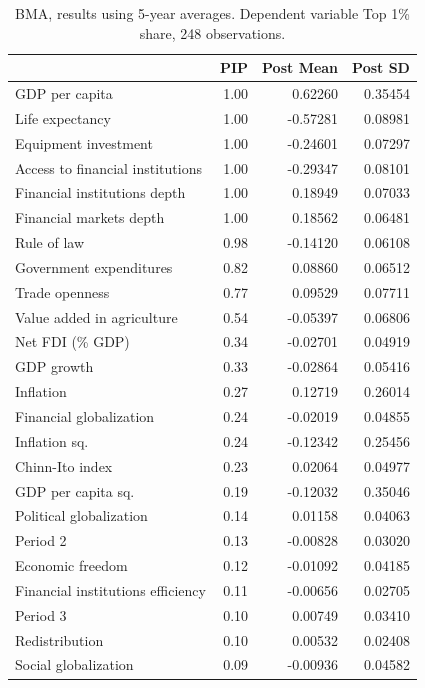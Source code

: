 \begin{refsection}
\begin{subappendices}
    \begin{table}[ht!]
      \centering
      \small
      \caption{BMA, results using 5-year averages. Dependent variable Top 1\% share, 248 observations.}\label{ch4res:5y_top1}
      \begin{tabular}{lrrr}
        \toprule
       & PIP & Post Mean & Post SD \\
        \midrule
        GDP per capita & 1.00 & 0.62260 & 0.35454 \\
  Life expectancy & 1.00 & -0.57281 & 0.08981 \\ 
  Equipment investment & 1.00 & -0.24601 & 0.07297 \\ 
  Access to financial institutions & 1.00 & -0.29347 & 0.08101 \\ 
  Financial institutions depth & 1.00 & 0.18949 & 0.07033 \\
  Financial markets depth & 1.00 & 0.18562 & 0.06481 \\ 
  Rule of law & 0.98 & -0.14120 & 0.06108 \\ 
  Government expenditures & 0.82 & 0.08860 & 0.06512 \\ 
  Trade openness & 0.77 & 0.09529 & 0.07711 \\ 
  Value added in agriculture & 0.54 & -0.05397 & 0.06806 \\
  Net FDI (\% GDP) & 0.34 & -0.02701 & 0.04919 \\ 
  GDP growth & 0.33 & -0.02864 & 0.05416 \\ 
  Inflation & 0.27 & 0.12719 & 0.26014 \\ 
  Financial globalization & 0.24 & -0.02019 & 0.04855 \\
  Inflation sq. & 0.24 & -0.12342 & 0.25456 \\
  Chinn-Ito index & 0.23 & 0.02064 & 0.04977 \\
  GDP per capita sq. & 0.19 & -0.12032 & 0.35046 \\ 
  Political globalization & 0.14 & 0.01158 & 0.04063 \\
  Period 2 & 0.13 & -0.00828 & 0.03020 \\
  Economic freedom & 0.12 & -0.01092 & 0.04185 \\ 
  Financial institutions efficiency & 0.11 & -0.00656 & 0.02705 \\
  Period 3 & 0.10 & 0.00749 & 0.03410 \\
  Redistribution & 0.10 & 0.00532 & 0.02408 \\
  Social globalization & 0.09 & -0.00936 & 0.04582 \\

\end{tabular}
\end{table}
\end{subappendices}
\end{refsection}
